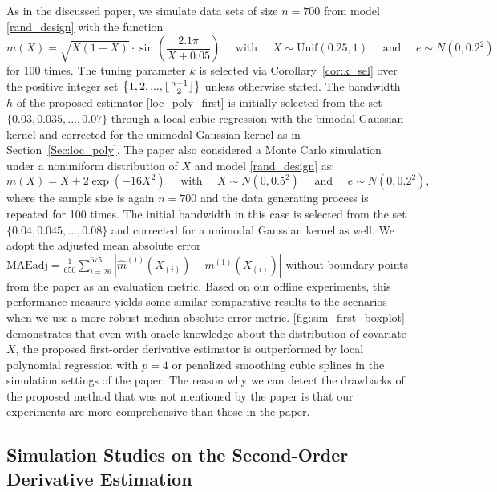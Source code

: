 \documentclass{uwstat572}
\theoremstyle{definition}
\DeclarePairedDelimiter\floor{\lfloor}{\rfloor}
\renewcommand{\hat}{\widehat}
\theoremstyle{theorem}
\begin{document}
As in the discussed paper, we simulate data sets of size $n=700$ from model \eqref{rand_design} with the function
\begin{equation}
\label{sim3_eq}
m(X) = \sqrt{X(1-X)} \cdot\sin\left(\frac{2.1\pi}{X+0.05}\right) \quad \text{ with } \quad X\sim \mathrm{Unif}(0.25,1) \quad \text{ and } \quad e\sim N(0,0.2^2)
\end{equation}
for $100$ times. The tuning parameter $k$ is selected via Corollary~\ref{cor:k_sel} over the positive integer set $\left\{1,2,...,\floor{\frac{n-1}{2}}\right\}$ unless otherwise stated. The bandwidth $h$ of the proposed estimator \eqref{loc_poly_first} is initially selected from the set $\{0.03, 0.035,...,0.07\}$ through a local cubic regression with the bimodal Gaussian kernel and corrected for the unimodal Gaussian kernel as in Section~\ref{Sec:loc_poly}. The paper also considered a Monte Carlo simulation under a nonuniform distribution of $X$ and model \eqref{rand_design} as:
\begin{equation}
	\label{sim4_eq}
	m(X) = X+ 2\exp\left(-16X^2\right) \quad \text{ with } \quad X\sim N(0,0.5^2) \quad \text{ and } \quad e\sim N(0,0.2^2),
\end{equation}
where the sample size is again $n=700$ and the data generating process is repeated for 100 times. The initial bandwidth in this case is selected from the set $\{0.04, 0.045,...,0.08\}$ and corrected for a unimodal Gaussian kernel as well. We adopt the adjusted mean absolute error $\text{MAEadj}=\frac{1}{650}\sum_{i=26}^{675} \left|\hat{m}^{(1)}(X_{(i)}) -m^{(1)}(X_{(i)}) \right|$ without boundary points from the paper as an evaluation metric. Based on our offline experiments, this performance measure yields some similar comparative results to the scenarios when we use a more robust median absolute error metric. \autoref{fig:sim_first_boxplot} demonstrates that even with oracle knowledge about the distribution of covariate $X$, the proposed first-order derivative estimator is outperformed by local polynomial regression with $p=4$ or penalized smoothing cubic splines in the simulation settings of the paper. The reason why we can detect the drawbacks of the proposed method that was not mentioned by the paper is that our experiments are more comprehensive than those in the paper.


\subsection{Simulation Studies on the Second-Order Derivative Estimation}
\label{Sec:sim_second_order}
\end{document}
